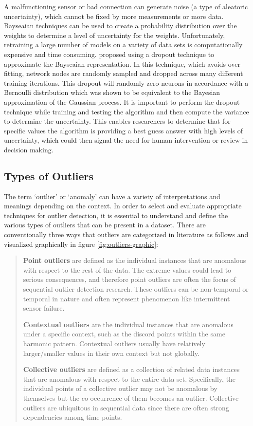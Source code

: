 A malfunctioning sensor or bad connection can generate noise (a type of aleatoric uncertainty), which cannot be fixed by more measurements or more data. Bayseaian techniques can be used to create a probability distribution over the weights to determine a level of uncertainty for the weights. Unfortunately, retraining a large number of models on a variety of data sets is computationally expensive and time consuming. \cite{gal2016dropout} proposed using a dropout technique to approximate the Bayseaian representation. In this technique, which avoids over-fitting, network nodes are randomly sampled and dropped across many different training iterations. This dropout will randomly zero neurons in accordance with a Bernoulli distribution which was shown to be equivalent to the Bayesian approximation of the Gaussian process. It is important to perform the dropout technique while training and testing the algorithm and then compute the variance to determine the uncertainty. This enables researchers to determine that for specific values the algorithm is providing a best guess answer with high levels of uncertainty, which could then signal the need for human intervention or review in decision making.  

\subsection{Types of Outliers}

The term `outlier' or `anomaly' can have a variety of interpretations and meanings depending on the context. In order to select and evaluate appropriate techniques for outlier detection, it is essential to understand and define the various types of outliers that can be present in a dataset. There are conventionally three ways that outliers are categorized in literature as follows \cite{lai2021revisiting} and visualized graphically in figure \ref{fig:outliers-graphic}:
\blockquote{
\textbf{Point outliers} are defined as the individual instances that are anomalous with respect to the rest of the
data. The extreme values could lead to serious consequences, and therefore point outliers are often
the focus of sequential outlier detection research. These outliers can be non-temporal or temporal in nature and often represent phenomenon like intermittent sensor failure. 

\textbf{Contextual outliers}  are the individual instances that are anomalous under a specific context, such as
the discord points within the same harmonic pattern. Contextual outliers usually have relatively
larger/smaller values in their own context but not globally.

\textbf{Collective outliers} are defined as a collection of related data instances that are anomalous with respect
to the entire data set. Specifically, the individual points of a collective outlier may not be anomalous
by themselves but the co-occurrence of them becomes an outlier. Collective outliers are ubiquitous
in sequential data since there are often strong dependencies among time points.
}

